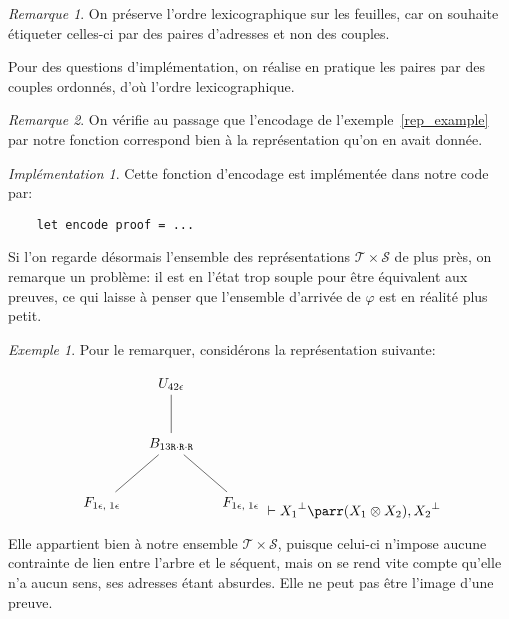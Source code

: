 \documentclass[11pt,a4paper]{article}
\theoremstyle{plain}
\theoremstyle{definition}
\theoremstyle{remark}
\newtheorem{remark}{Remarque}
\newtheorem{example}{Exemple}
\newtheorem{implementation}{Implémentation}
\newcommand*{\orth}{^\perp}
\newcommand*{\tensor}{\otimes}
\newcommand*{\Right}{\textnormal{\texttt{R}}}
\newcommand*{\sequents}{\ensuremath{\mathcal{S}}}
\newcommand*{\trees}{\ensuremath{\mathcal{T}}}
\newcommand*{\representationslarge}{\ensuremath{\trees \times \sequents}}
\newcommand*{\encode}{\ensuremath{\varphi}}
\begin{document}
\begin{remark}
    On préserve l'ordre lexicographique sur les feuilles, car on souhaite étiqueter celles-ci par des paires d'adresses et non des couples.

    Pour des questions d'implémentation, on réalise en pratique les paires par des couples ordonnés, d'où l'ordre lexicographique.
\end{remark}

\begin{remark}
    On vérifie au passage que l'encodage de l'exemple~\ref{rep_example} par notre fonction correspond bien à la représentation qu'on en avait donnée.
\end{remark}

\begin{implementation}
    Cette fonction d'encodage est implémentée dans notre code par:
    \begin{verbatim}
    let encode proof = ...
    \end{verbatim}
\end{implementation}

Si l'on regarde désormais l'ensemble des représentations $\representationslarge$ de plus près, on remarque un problème: il est en l'état trop souple pour être équivalent aux preuves, ce qui laisse à penser que l'ensemble d'arrivée de $\encode$ est en réalité plus petit.

\begin{example}
    Pour le remarquer, considérons la représentation suivante:
    
    \begin{equation*}
        \begin{tikzpicture}%
        [level 2/.style={sibling distance=3.5cm}]
        \node {$U_{42 \epsilon }$}
        child {node {$B_{13 \Right \cdot \Right \cdot \Right}$}
            child {node {$F_{1 \epsilon, \; 1 \epsilon}$}}
            child {node {$F_{1 \epsilon, \; 1 \epsilon}$}}
        };
        \end{tikzpicture}
        \vdash {X_1}\orth \parr (X_1 \tensor X_2), {X_2}\orth
    \end{equation*}

    Elle appartient bien à notre ensemble $\representationslarge$, puisque celui-ci n'impose aucune contrainte de lien entre l'arbre et le séquent, mais on se rend vite compte qu'elle n'a aucun sens, ses adresses étant absurdes. Elle ne peut pas être l'image d'une preuve.
\end{example}
\end{document}
